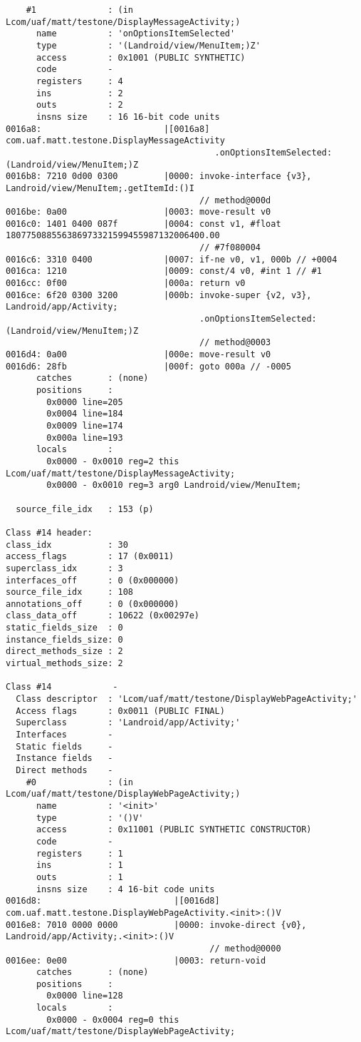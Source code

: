 \begin{lstlisting}
    #1              : (in Lcom/uaf/matt/testone/DisplayMessageActivity;)
      name          : 'onOptionsItemSelected'
      type          : '(Landroid/view/MenuItem;)Z'
      access        : 0x1001 (PUBLIC SYNTHETIC)
      code          -
      registers     : 4
      ins           : 2
      outs          : 2
      insns size    : 16 16-bit code units
0016a8:                        |[0016a8] com.uaf.matt.testone.DisplayMessageActivity
                                         .onOptionsItemSelected:(Landroid/view/MenuItem;)Z
0016b8: 7210 0d00 0300         |0000: invoke-interface {v3}, Landroid/view/MenuItem;.getItemId:()I
                                      // method@000d
0016be: 0a00                   |0003: move-result v0
0016c0: 1401 0400 087f         |0004: const v1, #float 180775088556386973321599455987132006400.00
                                      // #7f080004
0016c6: 3310 0400              |0007: if-ne v0, v1, 000b // +0004
0016ca: 1210                   |0009: const/4 v0, #int 1 // #1
0016cc: 0f00                   |000a: return v0
0016ce: 6f20 0300 3200         |000b: invoke-super {v2, v3}, Landroid/app/Activity;
                                      .onOptionsItemSelected:(Landroid/view/MenuItem;)Z
                                      // method@0003
0016d4: 0a00                   |000e: move-result v0
0016d6: 28fb                   |000f: goto 000a // -0005
      catches       : (none)
      positions     :
        0x0000 line=205
        0x0004 line=184
        0x0009 line=174
        0x000a line=193
      locals        :
        0x0000 - 0x0010 reg=2 this Lcom/uaf/matt/testone/DisplayMessageActivity;
        0x0000 - 0x0010 reg=3 arg0 Landroid/view/MenuItem;

  source_file_idx   : 153 (p)

Class #14 header:
class_idx           : 30
access_flags        : 17 (0x0011)
superclass_idx      : 3
interfaces_off      : 0 (0x000000)
source_file_idx     : 108
annotations_off     : 0 (0x000000)
class_data_off      : 10622 (0x00297e)
static_fields_size  : 0
instance_fields_size: 0
direct_methods_size : 2
virtual_methods_size: 2

Class #14            -
  Class descriptor  : 'Lcom/uaf/matt/testone/DisplayWebPageActivity;'
  Access flags      : 0x0011 (PUBLIC FINAL)
  Superclass        : 'Landroid/app/Activity;'
  Interfaces        -
  Static fields     -
  Instance fields   -
  Direct methods    -
    #0              : (in Lcom/uaf/matt/testone/DisplayWebPageActivity;)
      name          : '<init>'
      type          : '()V'
      access        : 0x11001 (PUBLIC SYNTHETIC CONSTRUCTOR)
      code          -
      registers     : 1
      ins           : 1
      outs          : 1
      insns size    : 4 16-bit code units
0016d8:                          |[0016d8] com.uaf.matt.testone.DisplayWebPageActivity.<init>:()V
0016e8: 7010 0000 0000           |0000: invoke-direct {v0}, Landroid/app/Activity;.<init>:()V
                                        // method@0000
0016ee: 0e00                     |0003: return-void
      catches       : (none)
      positions     :
        0x0000 line=128
      locals        :
        0x0000 - 0x0004 reg=0 this Lcom/uaf/matt/testone/DisplayWebPageActivity;


\end{lstlisting}
